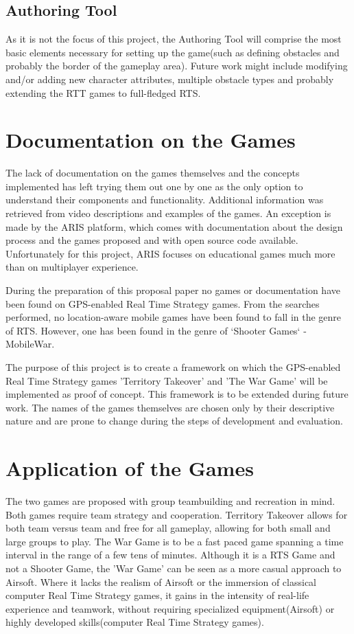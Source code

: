 \documentclass{article}
\begin{document}
\subsection{Authoring Tool}
As it is not the focus of this project, the Authoring Tool will comprise the
most basic elements necessary for setting up the game(such as defining obstacles
and probably the border of the gameplay area). Future work might include
modifying and/or adding new character attributes, multiple obstacle types and
probably extending the RTT games to full-fledged RTS.\newline

\section{Documentation on the Games}
The lack of documentation on the games themselves and the concepts implemented
has left trying them out one by one as the only option to understand their
components and functionality. Additional information was retrieved from
video descriptions and examples of the games. An exception is made by the ARIS
platform, which comes with documentation about the design process and the games
proposed and with open source code available. Unfortunately for this project,
ARIS focuses on educational games much more than on multiplayer
experience.\newline

During the preparation of this proposal paper no games or documentation have
been found on GPS-enabled Real Time Strategy games. From the searches performed,
no location-aware mobile games have been found to fall in the genre of RTS.
However, one has been found in the genre of `Shooter Games` - MobileWar.\newline 

The purpose of this project is to create a framework on which the GPS-enabled
Real Time Strategy games 'Territory Takeover' and 'The War Game' will be
implemented as proof of concept. This framework is to be extended during future
work. The names of the games themselves are chosen only by their descriptive
nature and are prone to change during the steps of development and evaluation.

\section{Application of the Games}
The two games are proposed with group teambuilding and recreation in mind. Both
games require team strategy and cooperation. Territory Takeover allows for both
team versus team and free for all gameplay, allowing for both small and large
groups to play. The War Game is to be a fast paced game spanning a time interval
in the range of a few tens of minutes. Although it is a RTS Game and not a
Shooter Game, the 'War Game' can be seen as a more casual approach to Airsoft.
Where it lacks the realism of Airsoft or the immersion of classical computer
Real Time Strategy games, it gains in the intensity of real-life experience and
teamwork, without requiring specialized equipment(Airsoft) or highly developed
skills(computer Real Time Strategy games).
\end{document}
